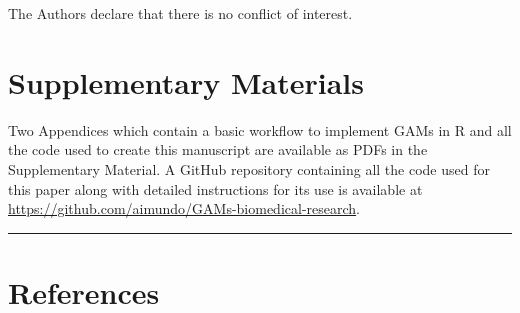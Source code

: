 \documentclass[
]{article}
\begin{document}
The Authors declare that there is no conflict of interest.

\hypertarget{supplementary-materials}{%
\section*{Supplementary Materials}\label{supplementary-materials}}

Two Appendices which contain a basic workflow to implement GAMs in R and all the code used to create this manuscript are available as PDFs in the Supplementary Material. A GitHub repository containing all the code used for this paper along with detailed instructions for its use is available at \url{https://github.com/aimundo/GAMs-biomedical-research}.

\begin{center}\rule{0.5\linewidth}{0.5pt}\end{center}

\hypertarget{references}{%
\section{References}\label{references}}
\end{document}
